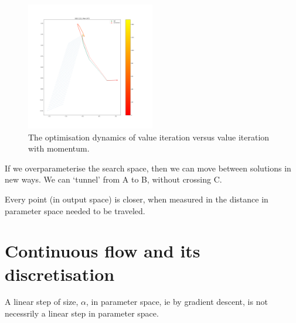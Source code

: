 \begin{figure}
\centering
\includegraphics[width=0.5\textwidth,height=0.5\textheight]{../../pictures/figures/vi_sgd-vs-vi_mom.png}
\caption{The optimisation dynamics of value iteration versus value iteration with momentum.}
\end{figure}

If we overparameterise the search space, then we can move between solutions in new ways. We can `tunnel' from A to B, without crossing C.

Every point (in output space) is closer, when measured in the distance in parameter space needed to be traveled.


\section{Continuous flow and its discretisation}

A linear step of size, \(\alpha\), in parameter space, ie by gradient
descent, is not necessrily a linear step in parameter space.

